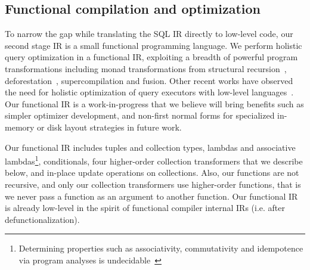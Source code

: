 \subsection{Functional compilation and optimization}
\label{sec:kthree}



\def\map{\mbox{\texttt{map}}}
\def\flatten{\mbox{\texttt{flatten}}}
\def\agg{\mbox{\texttt{agg}}}
\def\groupagg{\mbox{\texttt{groupagg}}}
\def\apply{\mbox{\texttt{apply}}}


To narrow the gap while translating the SQL IR directly to low-level code, our
second stage IR is a small functional programming language.
We perform holistic query optimization in a functional IR, exploiting a
breadth of powerful program transformations including monad transformations from
structural recursion~\cite{buneman-kleisli:95},
deforestation~\cite{marlow-fp:92}, supercompilation and fusion.
Other recent works have observed the need for holistic optimization of query
executors with low-level languages~\cite{krikellas-icde:10,neumann-pvldb:11}.
Our functional IR is a work-in-progress that we believe will bring benefits such
as simpler optimizer development, and non-first normal forms for specialized
in-memory or disk layout strategies in future work.


Our functional IR includes tuples and collection types, lambdas and associative
lambdas\footnote{Determining properties such as associativity, commutativity and
idempotence via program analyses is undecidable~\cite{buneman-kleisli:95}},
conditionals, four higher-order collection transformers that we describe below,
and in-place update operations on collections.
Also, our functions are not recursive, and only our collection transformers use
higher-order functions, that is we never pass a function as an argument to
another function. Our functional IR is already low-level in the spirit of
functional compiler internal IRs (i.e. after defunctionalization).



